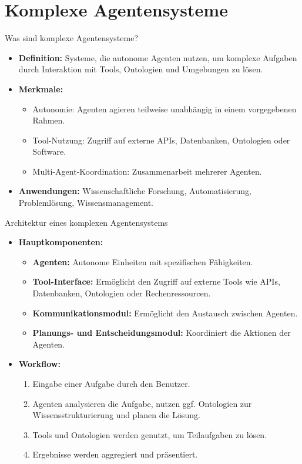 \documentclass[aspectratio=1610, xcolor=dvipsnames, 9pt]{beamer}
\begin{document}
\section{Komplexe Agentensysteme}

\begin{frame}{Was sind komplexe Agentensysteme?}
  \begin{itemize}
    \item \textbf{Definition:} Systeme, die autonome Agenten nutzen, um komplexe Aufgaben durch Interaktion mit Tools, Ontologien und Umgebungen zu lösen.
    \item \textbf{Merkmale:}
      \begin{itemize}
        \item Autonomie: Agenten agieren teilweise unabhängig in einem vorgegebenen Rahmen.
        \item Tool-Nutzung: Zugriff auf externe APIs, Datenbanken, Ontologien oder Software.
        \item Multi-Agent-Koordination: Zusammenarbeit mehrerer Agenten.
      \end{itemize}
    \item \textbf{Anwendungen:} Wissenschaftliche Forschung, Automatisierung, Problemlösung, Wissensmanagement.
  \end{itemize}
\end{frame}

\begin{frame}{Architektur eines komplexen Agentensystems}
  \begin{itemize}
    \item \textbf{Hauptkomponenten:}
      \begin{itemize}
        \item \textbf{Agenten:} Autonome Einheiten mit spezifischen Fähigkeiten.
        \item \textbf{Tool-Interface:} Ermöglicht den Zugriff auf externe Tools wie APIs, Datenbanken, Ontologien oder Rechenressourcen.
        \item \textbf{Kommunikationsmodul:} Ermöglicht den Austausch zwischen Agenten.
        \item \textbf{Planungs- und Entscheidungsmodul:} Koordiniert die Aktionen der Agenten.
      \end{itemize}
    \item \textbf{Workflow:}
      \begin{enumerate}
        \item Eingabe einer Aufgabe durch den Benutzer.
        \item Agenten analysieren die Aufgabe, nutzen ggf. Ontologien zur Wissensstrukturierung und planen die Lösung.
        \item Tools und Ontologien werden genutzt, um Teilaufgaben zu lösen.
        \item Ergebnisse werden aggregiert und präsentiert.
      \end{enumerate}
  \end{itemize}
\end{frame}
\end{document}
